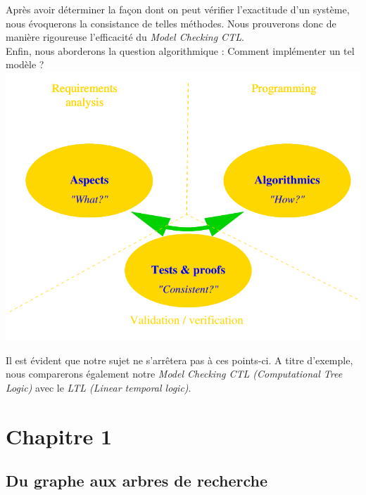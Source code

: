 \documentclass[11pt,a4paper]{article}
\begin{document}
\noindent Après avoir déterminer la façon dont on peut vérifier l'exactitude d'un système, nous évoquerons la consistance de telles méthodes. Nous prouverons donc de manière rigoureuse l'efficacité du \textit{Model Checking CTL}. \\

\noindent Enfin, nous aborderons la question algorithmique : Comment implémenter un tel modèle ? \\

\includegraphics[scale=0.5]{points.png}

\noindent Il est évident que notre sujet ne s'arrêtera pas à ces points-ci. A titre d'exemple, nous comparerons également notre \textit{Model Checking CTL (Computational Tree Logic)} avec le \textit{LTL (Linear temporal logic)}.

\newpage

\section{Chapitre 1}
\subsection{Du graphe aux arbres de recherche}
\end{document}

